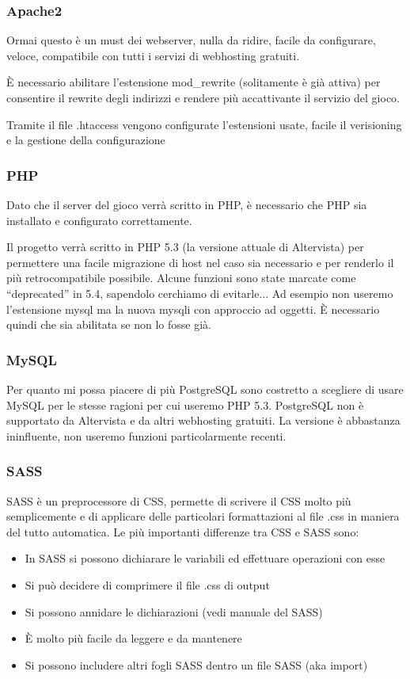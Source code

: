 \documentclass[10pt,a4paper]{article}
\begin{document}
\subsubsection*{Apache2}
Ormai questo è un must dei webserver, nulla da ridire, facile da configurare, veloce, compatibile con tutti i servizi di webhosting gratuiti. 

È necessario abilitare l'estensione mod\_rewrite (solitamente è già attiva) per consentire il rewrite degli indirizzi e rendere più accattivante il servizio del gioco.

Tramite il file .htaccess vengono configurate l'estensioni usate, facile il verisioning e la gestione della configurazione

\subsubsection*{PHP}
Dato che il server del gioco verrà scritto in PHP, è necessario che PHP sia installato e configurato correttamente. 

Il progetto verrà scritto in PHP 5.3 (la versione attuale di Altervista) per permettere una facile migrazione di host nel caso sia necessario e per renderlo il più retrocompatibile possibile. Alcune funzioni sono state marcate come “deprecated” in 5.4, sapendolo cerchiamo di evitarle... Ad esempio non useremo l'estensione mysql ma la nuova mysqli con approccio ad oggetti. È necessario quindi che sia abilitata se non lo fosse già.

\subsubsection*{MySQL}
Per quanto mi possa piacere di più PostgreSQL sono costretto a scegliere di usare MySQL per le stesse ragioni per cui useremo PHP 5.3. PostgreSQL non è supportato da Altervista e da altri webhosting gratuiti. La versione è abbastanza ininfluente, non useremo funzioni particolarmente recenti.

\subsubsection*{SASS}
SASS è un preprocessore di CSS, permette di scrivere il CSS molto più semplicemente e di applicare delle particolari formattazioni al file .css in maniera del tutto automatica. Le più importanti differenze tra CSS e SASS sono:
\begin{itemize}
\item In SASS si possono dichiarare le variabili ed effettuare operazioni con esse
\item Si può decidere di comprimere il file .css di output 
\item Si possono annidare le dichiarazioni (vedi manuale del SASS)
\item È molto più facile da leggere e da mantenere
\item Si possono includere altri fogli SASS dentro un file SASS (aka import)
\end{itemize}
\end{document}
